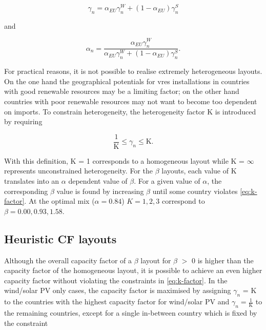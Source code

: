 \documentclass[a4paper, 5p, sort&compress]{elsarticle}%
\begin{document}

\begin{equation}
  \label{eq:9}
  \gamma_{n} = \alpha_{EU} \gamma^{W}_{n} + (1-\alpha_{EU}) \gamma^{S}_{n}
\end{equation}

and

\begin{equation}
  \label{eq:9}
  \alpha_{n} = \frac{\alpha_{EU} \gamma_{n}^{W}}{\alpha_{EU} \gamma_{n}^{W} + (1-\alpha_{EU}) \gamma_{n}^{S}} .
\end{equation}


For practical reasons, it is not possible to realise extremely
heterogeneous layouts. On the one hand the geographical potentials for
\gls{vres} installations in countries with good renewable resources may be a limiting factor; on the
other hand countries with poor renewable resources may not want to become too dependent on imports.
To constrain heterogeneity, the heterogeneity
factor K is introduced by requiring

\begin{equation}
  \label{eq:k-factor}
  \frac{1}{\text{K}} \leq \gamma_{n} \leq \text{K} .
\end{equation}

With this definition, K = 1 corresponds to a homogeneous layout while K = $\infty$
represents unconstrained heterogeneity. For the $\beta$
layouts, each value of K translates into an $\alpha$
dependent value of $\beta$.
For a given value of $\alpha$,
the corresponding $\beta$
value is found by increasing $\beta$
until some country violates \cref{eq:k-factor}. At the optimal mix ($\alpha = 0.84$)
$K= 1, 2, 3$ correspond to $\beta = 0.00, 0.93, 1.58$.

\subsection{Heuristic CF layouts}
\label{sec:CF-layout}

Although the overall capacity factor of a $\beta$ layout for $\beta$ $>$ 0 is higher than the
capacity factor of the homogeneous layout, it is
possible to achieve an even higher capacity factor without violating
the constraints in \cref{eq:k-factor}. In the wind/solar PV only
cases, the capacity factor is maximised by assigning $\gamma_{n}$ = K to
the countries with the highest capacity factor for wind/solar PV and
$\gamma_{n} = \frac{1}{\text{K}}$ to the remaining countries, except for a
single in-between country which is fixed by the constraint
\end{document}
